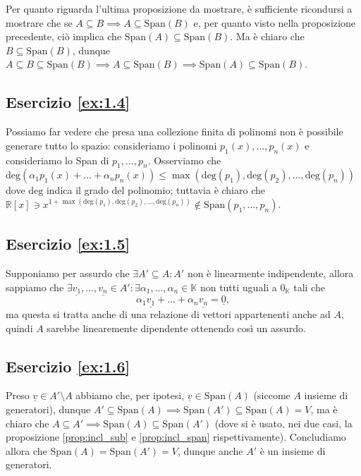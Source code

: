 Per quanto riguarda l'ultima proposizione da mostrare, è sufficiente ricondursi a mostrare che se $A \subseteq B \implies A \subseteq \text{Span}(B)$ e, per quanto visto nella proposizione precedente, ciò implica che $\text{Span}(A) \subseteq \text{Span}(B)$. Ma è chiaro che $B \subseteq \text{Span}(B)$, dunque $A \subseteq B \subseteq \text{Span}(B) \implies A \subseteq \text{Span}(B) \implies \text{Span}(A) \subseteq \text{Span}(B)$.
\subsection*{Esercizio \ref{ex:1.4}}

Possiamo far vedere che presa una collezione finita di polinomi non è possibile generare tutto lo spazio: consideriamo i polinomi $p_1(x), \ldots, p_n(x)$ e consideriamo lo Span di $p_1, \ldots, p_n$. Osserviamo che $\text{deg}(\alpha_1 p_1(x) + \ldots + \alpha_n p_n(x)) \leq \max (\text{deg}(p_1), \text{deg}(p_2), \ldots, \text{deg}(p_n))$ dove $\text{deg}$ indica il grado del polinomio; tuttavia è chiaro che $\mathbb{R}[x] \ni x^{1 + \max (\text{deg}(p_1), \text{deg}(p_2), \ldots, \text{deg}(p_n))} \not\in \text{Span}(p_1, \ldots, p_n)$.

\subsection*{Esercizio \ref{ex:1.5}}
Supponiamo per assurdo che $\exists A' \subseteq A: A'$ non è linearmente indipendente, allora sappiamo che $\exists \underline{v_1}, \ldots, \underline{v_n} \in A': \exists \alpha_1, \ldots, \alpha_n \in \mathbb{K}$ non tutti uguali a $0_\mathbb{K}$ tali che
$$
\alpha_1 \underline{v_1} + \ldots + \alpha_n \underline{v_n} = \underline{0},
$$ 
ma questa si tratta anche di una relazione di vettori appartenenti anche ad $A$, quindi $A$ sarebbe linearemente dipendente ottenendo così un assurdo.

\subsection*{Esercizio \ref{ex:1.6}}
Preso $\underline{v} \in A' \setminus A$ abbiamo che, per ipotesi, $\underline{v} \in \text{Span}(A)$ (siccome $A$ insieme di generatori), dunque $A' \subseteq \text{Span}(A) \implies \text{Span}(A') \subseteq \text{Span}(A) = V$, ma è chiaro che $A \subseteq A' \implies \text{Span}(A) \subseteq \text{Span}(A')$ (dove si è usato, nei due casi, la proposizione \ref{prop:incl_sub} e \ref{prop:incl_span} rispettivamente). Concludiamo allora che $\text{Span}(A) = \text{Span}(A') = V$, dunque anche $A'$ è un insieme di generatori.

